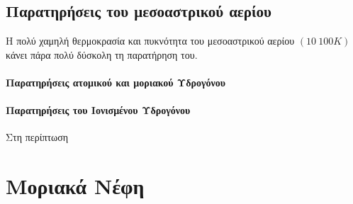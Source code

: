 \documentclass[a4paper,11pt]{memoir}
\begin{document}
\subsection{Παρατηρήσεις του μεσοαστρικού αερίου}
Η πολύ χαμηλή θερμοκρασία και πυκνότητα του μεσοαστρικού αερίου $(10~100 Κ)$ κάνει πάρα πολύ δύσκολη τη παρατήρηση του.   
\paragraph{Παρατηρήσεις ατομικού και μοριακού Υδρογόνου}
\paragraph{Παρατηρήσεις του Ιονισμένου Υδρογόνου}
Στη περίπτωση

\section{Μοριακά Νέφη}

\printbibliography
\end{document}
